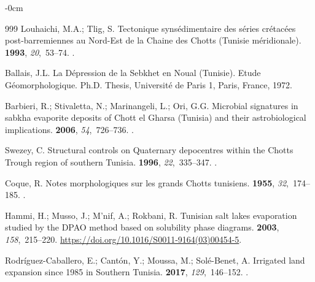 \documentclass[land,article,accept,pdftex,moreauthors]{Definitions/mdpi}
\begin{document}
\begin{adjustwidth}{-\extralength}{0cm}
\begin{thebibliography}{999}
Louhaichi, M.A.; Tlig, S.
\newblock Tectonique syns\'{e}dimentaire des séries cr\'{e}tac\'{e}es
  post-barremiennes au Nord-Est de la Chaine des Chotts (Tunisie
  m\'{e}ridionale).
 {\bf 1993}, {\em 20},~53--74.
.

Ballais, J.L.
\newblock La Dépression de la Sebkhet en Noual (Tunisie). Etude
  Géomorphologique.
\newblock Ph.D. Thesis, Université de Paris 1, Paris, France,  1972.

Barbieri, R.; Stivaletta, N.; Marinangeli, L.; Ori, G.G.
\newblock Microbial signatures in sabkha evaporite deposits of Chott el Gharsa
  (Tunisia) and their astrobiological implications.
 {\bf 2006}, {\em 54},~726--736.
.

Swezey, C.
\newblock Structural controls on Quaternary depocentres within the Chotts
  Trough region of southern Tunisia.
 {\bf 1996}, {\em
  22},~335--347.
.

Coque, R.
\newblock Notes morphologiques sur les grands Chotts tunisiens.
 {\bf 1955},
  {\em 32},~174--185.
.

Hammi, H.; Musso, J.; M'nif, A.; Rokbani, R.
\newblock Tunisian salt lakes evaporation studied by the DPAO method based on
  solubility phase diagrams.
 {\bf 2003}, {\em 158},~215--220.
\newblock %
  {\url{https://doi.org/10.1016/S0011-9164(03)00454-5}}.

Rodríguez-Caballero, E.; Cantón, Y.; Moussa, M.; Solé-Benet, A.
\newblock Irrigated land expansion since 1985 in Southern Tunisia.
 {\bf 2017}, {\em
  129},~146--152.
.


\end{thebibliography}
\end{adjustwidth}
\end{document}
